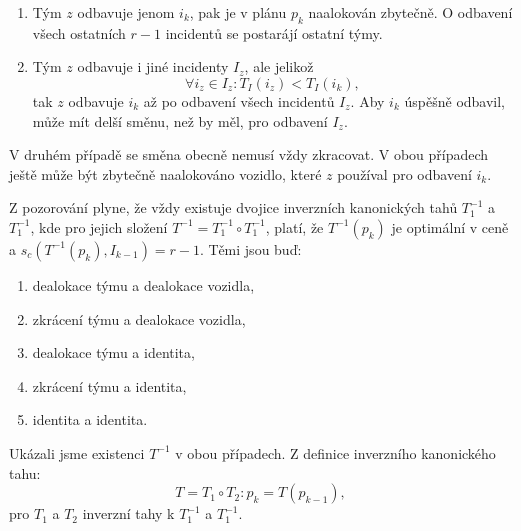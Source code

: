 \begin{dukaz}
  \begin{enumerate}
    \item
      Tým $z$ odbavuje jenom $i_k$, pak je v plánu $p_k$ naalokován zbytečně. O odbavení všech ostatních $r-1$ incidentů se postarájí ostatní týmy.

    \item
      Tým $z$ odbavuje i jiné incidenty $I_z$, ale jelikož
      \begin{equation*}
        \forall i_z \in I_z \colon T_I(i_z) < T_I(i_k),
      \end{equation*}
      tak $z$ odbavuje $i_k$ až po odbavení všech incidentů $I_z$.
      Aby $i_k$ úspěšně odbavil, může mít delší směnu, než by měl, pro odbavení $I_z$.
  \end{enumerate}

  V druhém případě se směna obecně nemusí vždy zkracovat.
  V obou případech ještě může být zbytečně naalokováno vozidlo, které $z$ používal pro odbavení $i_k$.

  Z pozorování plyne, že vždy existuje dvojice inverzních kanonických tahů $T_1^{-1}$ a $T_1^{-1}$, kde pro jejich složení $T^{-1} = T_1^{-1} \circ T_1^{-1}$,
  platí, že $T^{-1}(p_k)$ je optimální v ceně a $s_c(T^{-1}(p_k), I_{k-1}) = r - 1$.
  Těmi jsou buď:
  \begin{enumerate}
  \item
    dealokace týmu a dealokace vozidla, 
  \item
    zkrácení týmu a dealokace vozidla,
  \item
    dealokace týmu a identita,
  \item
    zkrácení týmu a identita,
  \item
    identita a identita.
  \end{enumerate}

  Ukázali jsme existenci $T^{-1}$ v obou případech. Z definice inverzního kanonického tahu:
  \begin{equation*}
    T = T_1 \circ T_2 \colon p_k = T(p_{k-1}), 
  \end{equation*}
  pro $T_1$ a $T_2$ inverzní tahy k $T_1^{-1}$ a $T_1^{-1}$.
\end{dukaz}

